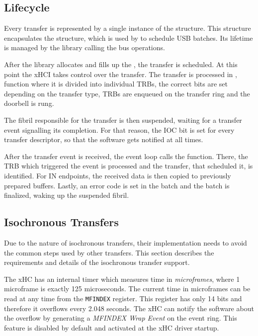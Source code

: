 \subsection{Lifecycle}

Every transfer is represented by a single instance of the 
structure. This structure encapsulates the 
structure, which is used by  to schedule USB batches. Its
lifetime is managed by the library calling the bus operations.

After the library allocates and fills up the , the
transfer is scheduled. At this point the xHCI takes control over the transfer.
The transfer is processed in , function where it is divided into individual
TRBs, the correct bits are set depending on the transfer type, TRBs are
enqueued on the transfer ring and the doorbell is rung.

The fibril responsible for the transfer is then suspended, waiting for a transfer event
signalling its completion. For that reason, the IOC bit is set
for every transfer descriptor, so that the software gets notified at all times.

After the transfer event is received, the event loop calls the
 function. There, the TRB which triggered the event is
processed and the transfer, that scheduled it, is identified. For IN endpoints, the
received data is then copied to previously prepared buffers. Lastly, an error code is set in
the batch and the batch is finalized, waking up the suspended fibril.

\subsection{Isochronous Transfers}

Due to the nature of isochronous transfers, their implementation needs to avoid
the common steps used by other transfers. This section describes the
requirements and details of the isochronous transfer support.

The xHC has an internal timer which measures time in \textit{microframes},
where 1 microframe is exactly 125 microseconds. The current time in microframes
can be read at any time from the \texttt{MFINDEX} register. This register has only
14 bits and therefore it overflows every 2.048 seconds. The xHC can notify the
software about the overflow by generating a \textit{MFINDEX Wrap Event} on the
event ring. This feature is disabled by default and activated at the xHC driver startup.

